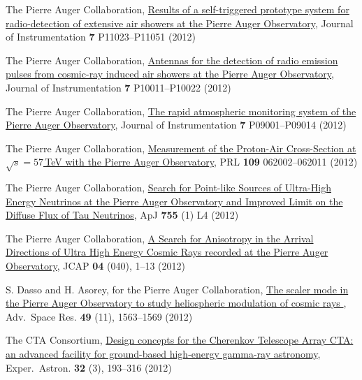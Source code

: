 \begin{etaremune}
\item {}The Pierre Auger Collaboration,
\href{http://dx.doi.org/10.1088/1748-0221/7/11/P11023}{{Results of a
self-triggered prototype system for radio-detection of extensive air showers at
the Pierre Auger Observatory}}, Journal of Instrumentation {\textbf{7}} P11023--P11051 (2012)

\item {}The Pierre Auger Collaboration,
\href{http://dx.doi.org/10.1088/1748-0221/7/10/P10011}{{Antennas for the
detection of radio emission pulses from cosmic-ray induced air showers at the
Pierre Auger Observatory}}, Journal of Instrumentation {\textbf{7}} P10011--P10022 (2012)

\item {}The Pierre Auger Collaboration,
\href{http://dx.doi.org/10.1088/1748-0221/7/09/P09001}{{The rapid
atmospheric monitoring system of the Pierre Auger Observatory}}, Journal of Instrumentation
{\textbf{7}} P09001--P09014 (2012)

\item {}The Pierre Auger Collaboration,
\href{http://dx.doi.org/10.1103/PhysRevLett.109.062002}{{Measurement of
the Proton-Air Cross-Section at $\sqrt{s}=57$\,TeV with the Pierre Auger
Observatory}}, PRL {\textbf{109}} 062002--062011 (2012)

\item {}The Pierre Auger Collaboration,
\href{http://dx.doi.org/10.1088/2041-8205/755/1/L4}{{Search for Point-like
Sources of Ultra-High Energy Neutrinos at the Pierre Auger Observatory and
Improved Limit on the Diffuse Flux of Tau Neutrinos}}, ApJ {\textbf{755}} (1) L4
(2012)

\item {}The Pierre Auger Collaboration, 
\href{http://dx.doi.org/10.1088/1475-7516/2012/04/040}{{A Search for
Anisotropy in the Arrival Directions of Ultra High Energy Cosmic Rays recorded
at the Pierre Auger Observatory}}, JCAP {\textbf{04}} (040), 1--13 (2012)

\item {}S. Dasso and H. Asorey, for the Pierre Auger Collaboration,
\href{http://dx.doi.org/10.1016/j.asr.2011.12.028}{{ The scaler mode in
the Pierre Auger Observatory to study heliospheric modulation of cosmic rays
}}, Adv.\ Space Res. {\textbf{49}} (11), 1563--1569 (2012)

\item {}The CTA Consortium,
\href{http://dx.doi.org/10.1007/s10686-011-9247-0}{{Design concepts for
the Cherenkov Telescope Array CTA: an advanced facility for ground-based
high-energy gamma-ray astronomy}}, Exper.\ Astron. {\textbf{32}} (3), 193--316
(2012)


\end{etaremune}
